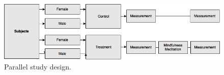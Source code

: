 \begin{figure}[H]
	\includegraphics[width=1\textwidth]{figures/studydesign.png} 
	\caption{Parallel study design.}
	\label{fig:studydesign}  
\end{figure}  





